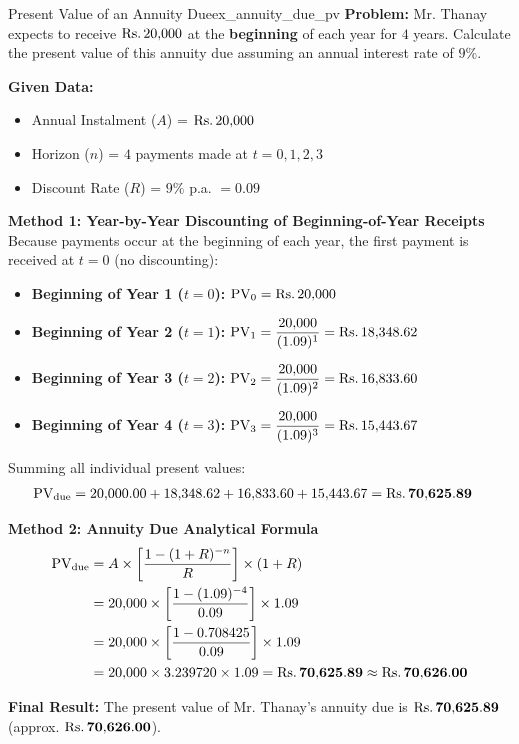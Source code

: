 \begin{example}{Present Value of an Annuity Due}{ex_annuity_due_pv}
\textbf{Problem:}
Mr. Thanay expects to receive $\text{Rs.}\, 20{,}000$ at the \textbf{beginning} of each year for $4$ years. Calculate the present value of this annuity due assuming an annual interest rate of $9\%$.

\tcbline
\textbf{Given Data:}
\begin{itemize}[noitemsep]
    \item Annual Instalment ($A$) = $\text{Rs.}\, 20{,}000$
    \item Horizon ($n$) = $4$ payments made at $t = 0, 1, 2, 3$
    \item Discount Rate ($R$) = $9\%$ p.a. $= 0.09$
\end{itemize}

\textbf{Method 1: Year-by-Year Discounting of Beginning-of-Year Receipts}
Because payments occur at the beginning of each year, the first payment is received at $t = 0$ (no discounting):
\begin{itemize}[leftmargin=*]
    \item \textbf{Beginning of Year 1 ($t = 0$):} $\operatorname{PV}_0 = \text{Rs.}\, 20{,}000$
    \item \textbf{Beginning of Year 2 ($t = 1$):} $\operatorname{PV}_1 = \dfrac{20{,}000}{(1.09)^1} = \text{Rs.}\, 18{,}348.62$
    \item \textbf{Beginning of Year 3 ($t = 2$):} $\operatorname{PV}_2 = \dfrac{20{,}000}{(1.09)^2} = \text{Rs.}\, 16{,}833.60$
    \item \textbf{Beginning of Year 4 ($t = 3$):} $\operatorname{PV}_3 = \dfrac{20{,}000}{(1.09)^3} = \text{Rs.}\, 15{,}443.67$
\end{itemize}
Summing all individual present values:
\begin{align*}
    \operatorname{PV}_{\text{due}} &= 20{,}000.00 + 18{,}348.62 + 16{,}833.60 + 15{,}443.67 = \mathbf{\text{Rs.}\, 70{,}625.89}
\end{align*}

\textbf{Method 2: Annuity Due Analytical Formula}
\begin{align*}
    \operatorname{PV}_{\text{due}} &= A \times \left[ \frac{1 - (1 + R)^{-n}}{R} \right] \times (1 + R) \\
    &= 20{,}000 \times \left[ \frac{1 - (1.09)^{-4}}{0.09} \right] \times 1.09 \\
    &= 20{,}000 \times \left[ \frac{1 - 0.708425}{0.09} \right] \times 1.09 \\
    &= 20{,}000 \times 3.239720 \times 1.09 = \mathbf{\text{Rs.}\, 70{,}625.89} \approx \mathbf{\text{Rs.}\, 70{,}626.00}
\end{align*}

\textbf{Final Result:}
The present value of Mr. Thanay's annuity due is $\mathbf{\text{Rs.}\, 70{,}625.89}$ (approx. $\mathbf{\text{Rs.}\, 70{,}626.00}$).
\end{example}

